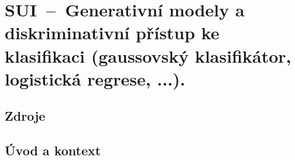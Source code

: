 

\graphicspath{{sui/klasifikace_generativni_diskriminativni/figures}}


\chapter{SUI~--~Generativní modely a diskriminativní přístup ke klasifikaci (gaussovský klasifikátor, logistická regrese, ...).}


\section{Zdroje}

\begin{compactitem}
    \item {}
    \item {}
    \item {}
\end{compactitem}


\section{Úvod a kontext}

